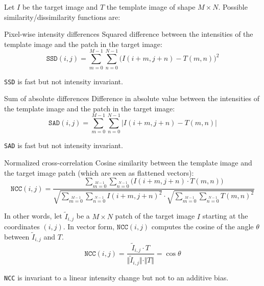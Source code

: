 Let $I$ be the target image and $T$ the template image of shape $M \times N$.
Possible similarity/dissimilarity functions are:
\begin{descriptionlist}
    \item[Pixel-wise intensity differences] 
        Squared difference between the intensities of the template image and the patch in the target image:
        \[ \texttt{SSD}(i, j) = \sum_{m=0}^{M-1} \sum_{n=0}^{N-1} \big( I(i+m, j+n) - T(m, n) \big)^2 \]
        
        \begin{remark}
            \texttt{SSD} is fast but not intensity invariant.
        \end{remark}

    \item[Sum of absolute differences] 
        Difference in absolute value between the intensities of the template image and the patch in the target image:
        \[ \texttt{SAD}(i, j) = \sum_{m=0}^{M-1} \sum_{n=0}^{N-1} \big\vert I(i+m, j+n) - T(m, n) \big\vert \]
        
        \begin{remark}
            \texttt{SAD} is fast but not intensity invariant.
        \end{remark}

    \item[Normalized cross-correlation] 
        Cosine similarity between the template image and the target image patch (which are seen as flattened vectors):
        \[ 
            \texttt{NCC}(i, j) = 
            \frac{ \sum\limits_{m=0}\limits^{M-1} \sum\limits_{n=0}\limits^{N-1} \big( I(i+m, j+n) \cdot T(m, n) \big) }
                { \sqrt{\sum\limits_{m=0}\limits^{M-1} \sum\limits_{n=0}\limits^{N-1} I(i+m, j+n)^2} \cdot \sqrt{\sum\limits_{m=0}\limits^{M-1} \sum\limits_{n=0}\limits^{N-1} T(m, n)^2} } 
        \]

        In other words, let $\tilde{I}_{i,j}$ be a $M \times N$ patch of the target image $I$ starting at the coordinates $(i, j)$.
        In vector form, $\texttt{NCC}(i, j)$ computes the cosine of the angle $\theta$ between $\tilde{I}_{i,j}$ and $T$.
        \[ \texttt{NCC}(i, j) = \frac{\tilde{I}_{i,j} \cdot T}{\Vert \tilde{I}_{i,j} \Vert \cdot \Vert T \Vert} = \cos \theta \]

        \begin{remark}
            \texttt{NCC} is invariant to a linear intensity change but not to an additive bias.
        \end{remark}


\end{descriptionlist}
